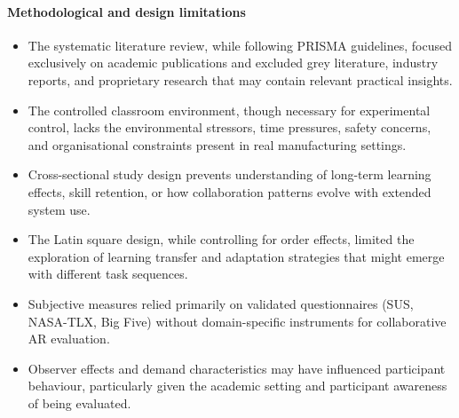\paragraph{Methodological and design limitations}
\begin{itemize}
    \item The systematic literature review, while following PRISMA guidelines, focused exclusively on academic publications and excluded grey literature, industry reports, and proprietary research that may contain relevant practical insights.
    \item The controlled classroom environment, though necessary for experimental control, lacks the environmental stressors, time pressures, safety concerns, and organisational constraints present in real manufacturing settings.
    \item Cross-sectional study design prevents understanding of long-term learning effects, skill retention, or how collaboration patterns evolve with extended system use.
    \item The Latin square design, while controlling for order effects, limited the exploration of learning transfer and adaptation strategies that might emerge with different task sequences.
    \item Subjective measures relied primarily on validated questionnaires (SUS, NASA-TLX, Big Five) without domain-specific instruments for collaborative AR evaluation.
    \item Observer effects and demand characteristics may have influenced participant behaviour, particularly given the academic setting and participant awareness of being evaluated.
\end{itemize}

